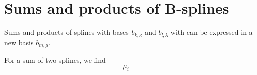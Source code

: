 \documentclass{article}
\begin{document}


\appendix
\section{Sums and products of B-splines}
Sums and products of splines with bases $b_{k,\kappa}$ and $b_{l,\lambda}$ with
can be expressed in a new basis $b_{m, \mu}$.

For a sum of two splines, we find
\[\mu_i = \]



\end{document}
